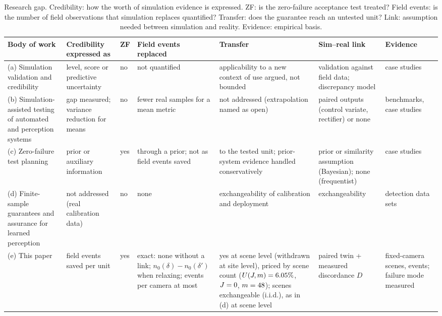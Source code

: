 \begin{table}[t]
\centering
\caption{Research gap. Credibility: how the worth of simulation evidence is expressed. ZF: is the zero-failure acceptance
test treated? Field events: is the number of field observations that simulation replaces quantified? Transfer: does the
guarantee reach an untested unit? Link: assumption needed between simulation and reality. Evidence: empirical basis.}
\label{tab:gap}
\scriptsize
\setlength{\tabcolsep}{2pt}
\begin{tabular}{@{}L{0.17\textwidth}L{0.13\textwidth}L{0.04\textwidth}L{0.15\textwidth}L{0.15\textwidth}L{0.15\textwidth}L{0.13\textwidth}@{}}
\toprule
Body of work & Credibility expressed as & ZF & Field events replaced & Transfer & Sim--real link & Evidence \\
\midrule
(a) Simulation validation and credibility~\cite{sargent2013vv,oberkampf2010vv,asme2018vv40,kennedy2001calibration,roy2011vvuq,pathmanathan2017applicability,shi2025dtcredibility}
 & level, score or predictive uncertainty & no & not quantified & applicability to a new context of use argued, not bounded & validation against field data; discrepancy model & case studies \\
(b) Simulation-assisted testing of automated and perception systems~\cite{wang2025dtplatform,li2025flamedt,riedmaier2021vvuq,reway2020simgap,luo2025sim2val,angelopoulos2023ppi}
 & gap measured; variance reduction for means & no & fewer real samples for a mean metric & not addressed (extrapolation named as open) & paired outputs (control variate, rectifier) or none & benchmarks, case studies \\
(c) Zero-failure test planning~\cite{hanley1983,baze1979,wilson2021assurance,ding2024truncated,wang2024monoprop,zhao2018perfection}
 & prior or auxiliary information & yes & through a prior; not as field events saved & to the tested unit; prior-system evidence handled conservatively & prior or similarity assumption (Bayesian); none (frequentist) & case studies \\
(d) Finite-sample guarantees and assurance for learned perception~\cite{angelopoulos2025ltt,degrancey2022conformaldet,mei2025pwc,yuan2026conformal,paterson2025amlas}
 & not addressed (real calibration data) & no & none & exchangeability of calibration and deployment & exchangeability & detection data sets \\
(e) This paper & field events saved per unit & yes & exact: none without a link; $n_0(\delta)-n_0(\delta')$ when relaxing; \nSavedOP{} events per camera at most & yes at scene level (withdrawn at site level), priced by scene count ($U(J,m)=6.05\%$, $J=0$, $m=48$); scenes exchangeable (i.i.d.), as in (d) at scene level & paired twin + measured discordance $D$ & \nMainScenes{} fixed-camera scenes, \nMainN{} events; failure mode measured \\
\bottomrule
\end{tabular}
\end{table}
